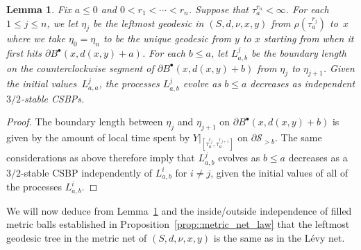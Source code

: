 \documentclass[JEP,XML,SOM,Unicode]{cedram}
\let\mathcal\mathscr
\newcommand{\sbullet}{{\scriptscriptstyle\bullet}}
\theoremstyle{plain}
\numberwithin{theorem}{section}
\newtheorem{lemma}[theorem]{Lemma}
\theoremstyle{definition}
\newcommand{\snake}{{\mathcal S}}
\newcommand{\fb}[2]{B^\sbullet(#1,#2)}
\begin{document}
\begin{lemma}
\label{lem:geodesic_boundary_length_csbp}
Fix $a \leq 0$ and $0 < r_1 < \cdots < r_n$. Suppose that $\tau_{a}^{r_n} < \infty$. For each $1 \leq j \leq n$, we let $\eta_j$ be the leftmost geodesic in $(S,d,\nu,x,y)$ from $\rho(\tau_a^{r_j})$ to~$x$ where we take $\eta_0 = \eta_n$ to be the unique geodesic from $y$ to $x$ starting from when it first hits $\partial \fb{x}{d(x,y)+a}$. For each $b \leq a$, let $L_{a,b}^{j}$ be the boundary length on the counterclockwise segment of $\partial \fb{x}{d(x,y)+b}$ from $\eta_j$ to $\eta_{j+1}$. Given the initial values~$L_{a,a}^j$, the processes $L_{a,b}^j$ evolve as $b \leq a$ decreases as independent $3/2$-stable CSBPs.
\end{lemma}
\begin{proof}
The boundary length between $\eta_j$ and $\eta_{j+1}$ on $\partial \fb{x}{d(x,y)+b}$ is given by the amount of local time spent by $Y|_{[\tau_{a}^{r_j},\tau_a^{r_{j+1}}]}$ on $\partial \snake_{> b}$. The same considerations as above therefore imply that $L_{a,b}^j$ evolves as $b \leq a$ decreases as a $3/2$-stable CSBP independently of $L_{a,b}^i$ for $i \neq j$, given the initial values of all of the processes $L_{a,b}^i$.
\end{proof}

We will now deduce from Lemma~\ref{lem:geodesic_boundary_length_csbp} and the inside/outside independence of filled metric balls established in Proposition~\ref{prop::metric_net_law} that the leftmost geodesic tree in the metric net of $(S,d,\nu,x,y)$ is the same as in the Lévy net.
\end{document}

